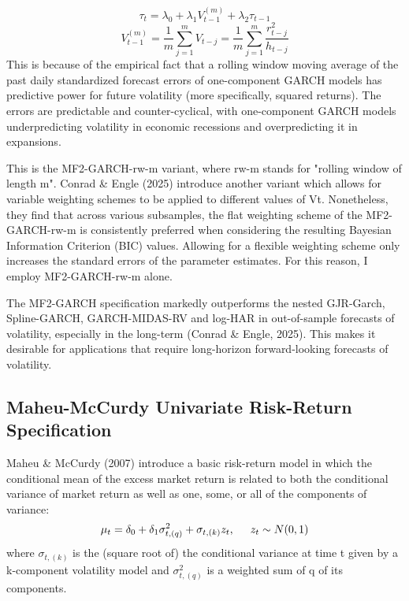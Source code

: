 \documentclass[12pt]{article}
\begin{document}
\begin{equation}
\tau_t=\lambda_0+\lambda_1V_{t-1}^{(m)}+\lambda_2\tau_{t-1}
\end{equation}
\begin{equation}
V_{t-1}^{(m)}=\frac{1}{m}\sum_{j=1}^mV_{t-j}=\frac{1}{m}\sum_{j=1}^m\frac{r_{t-j}^2}{h_{t-j}}
\end{equation}
This is because of the empirical fact that a rolling window moving average of the past daily standardized forecast errors of one-component GARCH models has predictive power for future volatility (more specifically, squared returns). The errors are predictable and counter-cyclical, with one-component GARCH models underpredicting volatility in economic recessions and overpredicting it in expansions. \par
This is the MF2-GARCH-rw-m variant, where rw-m stands for "rolling window of length m". Conrad \& Engle (2025) introduce another variant which allows for variable weighting schemes to be applied to different values of Vt. Nonetheless, they find that across various subsamples, the flat weighting scheme of the MF2-GARCH-rw-m is consistently preferred when considering the resulting Bayesian Information Criterion (BIC) values. Allowing for a flexible weighting scheme only increases the standard errors of the parameter estimates. For this reason, I employ MF2-GARCH-rw-m alone.\par
The MF2-GARCH specification markedly outperforms the nested GJR-Garch, Spline-GARCH, GARCH-MIDAS-RV and log-HAR in out-of-sample forecasts of volatility, especially in the long-term (Conrad \& Engle, 2025). This makes it desirable for applications that require long-horizon forward-looking forecasts of volatility.\par
\subsection{Maheu-McCurdy Univariate Risk-Return Specification}
Maheu \& McCurdy (2007) introduce a basic risk-return model in which the conditional mean of the excess market return is related to both the conditional variance of market return as well as one, some, or all of the components of variance:
\begin{equation}
\mu_t=\delta_0+\delta_1\sigma_{t,(q)}^2+\sigma_{t,(k)}z_t, \hspace{5mm}z_t\sim N(0,1)
\end{equation}
where $\sigma_{t,(k)}$ is the (square root of) the conditional variance at time t given by a k-component volatility model and $\sigma_{t,(q)}^2$ is a weighted sum of q of its components.
\end{document}
